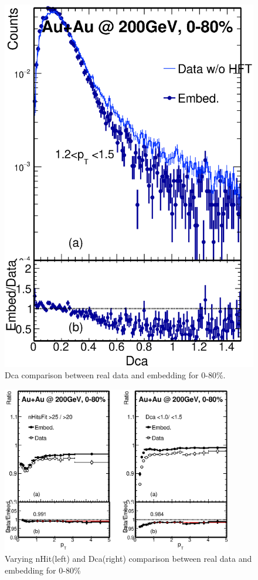 \begin{figure}[htbp]
\begin{minipage}[htbp]{0.45\linewidth}
\includegraphics[width=1.0\textwidth,angle=0]{figure/Run14_D0HFT/Dca11_6.eps} 
\caption{ Dca comparison between real data and embedding for 0-80\%. \label{Dca_0_80}}
\end{minipage}
\end{figure}

\begin{figure}[htbp]
\centering
\includegraphics[keepaspectratio,width=0.9\textwidth]{figure/Run14_D0HFT/nFit_Dca_Ratio_7.eps}
\caption{Varying nHit(left) and Dca(right) comparison between real data and embedding for 0-80\% }
\label{nFit_Dca_Ratio_7}
\end{figure}


